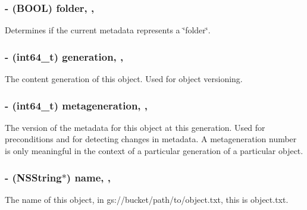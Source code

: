\subsubsection[{folder}]{\setlength{\rightskip}{0pt plus 5cm}-\/ (B\+O\+O\+L) folder\hspace{0.3cm}{\ttfamily [read]}, {\ttfamily [atomic]}, {\ttfamily [assign]}}\label{interface_f_i_r_storage_metadata_a99ce3b3110b480cc90a8120a70dec971}
Determines if the current metadata represents a \char`\"{}folder\char`\"{}. \hypertarget{interface_f_i_r_storage_metadata_acd11f19a7fcbb1f2659f726a64a6f98a}{}
\subsubsection[{generation}]{\setlength{\rightskip}{0pt plus 5cm}-\/ (int64\+\_\+t) generation\hspace{0.3cm}{\ttfamily [read]}, {\ttfamily [atomic]}, {\ttfamily [assign]}}\label{interface_f_i_r_storage_metadata_acd11f19a7fcbb1f2659f726a64a6f98a}
The content generation of this object. Used for object versioning. \hypertarget{interface_f_i_r_storage_metadata_a180ce1f0978ba7c89b6381bd123af20c}{}
\subsubsection[{metageneration}]{\setlength{\rightskip}{0pt plus 5cm}-\/ (int64\+\_\+t) metageneration\hspace{0.3cm}{\ttfamily [read]}, {\ttfamily [atomic]}, {\ttfamily [assign]}}\label{interface_f_i_r_storage_metadata_a180ce1f0978ba7c89b6381bd123af20c}
The version of the metadata for this object at this generation. Used for preconditions and for detecting changes in metadata. A metageneration number is only meaningful in the context of a particular generation of a particular object. \hypertarget{interface_f_i_r_storage_metadata_a9c68a1e47f6d3dc053e2c291bdf91e6b}{}
\subsubsection[{name}]{\setlength{\rightskip}{0pt plus 5cm}-\/ (N\+S\+String$\ast$) name\hspace{0.3cm}{\ttfamily [read]}, {\ttfamily [nonatomic]}, {\ttfamily [copy]}}\label{interface_f_i_r_storage_metadata_a9c68a1e47f6d3dc053e2c291bdf91e6b}
The name of this object, in gs\+://bucket/path/to/object.txt, this is object.\+txt. \hypertarget{interface_f_i_r_storage_metadata_a27e524765d46c62512a894ff7e361619}{}
